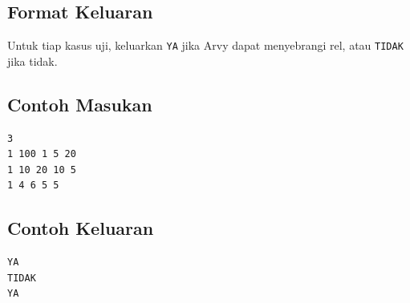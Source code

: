 \documentclass{article}
\begin{document}
\subsection*{Format Keluaran}
Untuk tiap kasus uji, keluarkan \lstinline{YA} jika Arvy dapat menyebrangi rel, atau \lstinline{TIDAK} jika tidak.

\begin{multicols}{2}
\subsection*{Contoh Masukan}
\begin{lstlisting}
3
1 100 1 5 20
1 10 20 10 5
1 4 6 5 5
\end{lstlisting}
\columnbreak
\subsection*{Contoh Keluaran}
\begin{lstlisting}
YA
TIDAK
YA
\end{lstlisting}
\vfill
\null
\end{multicols}
\end{document}
